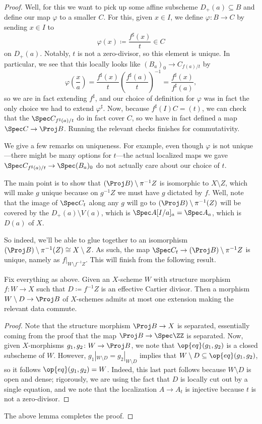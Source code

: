 \documentclass[../notes.tex]{subfiles}
\begin{document}
\begin{proof}
	Well, for this we want to pick up some affine subscheme $D_+(a)\subseteq B$ and define our map $\varphi$ to a smaller $C$. For this, given $x\in I$, we define $\varphi\colon B\to C$ by sending $x\in I$ to
	\[\varphi(x)\coloneqq\frac{f^\sharp(x)}t\in C\]
	on $D_+(a)$. Notably, $t$ is not a zero-divisor, so this element is unique. In particular, we see that this locally looks like $(B_a)_0\to C_{f(a)/t}$ by
	\[\varphi\left(\frac xa\right)=\frac{f^\sharp(x)}t\left(\frac{f^\sharp(a)}t\right)^{-1}=\frac{f^\sharp(x)}{f^\sharp(a)},\]
	so we are in fact extending $f^\sharp$, and our choice of definition for $\varphi$ was in fact the only choice we had to extend $\varphi^\sharp$. Now, because $f^\sharp(I)C=(t)$, we can check that the $\Spec C_{f^\sharp(a)/t}$ do in fact cover $C$, so we have in fact defined a map $\Spec C\to\Proj B$. Running the relevant checks finishes for commutativity.

	We give a few remarks on uniqueness. For example, even though $\varphi$ is not unique---there might be many options for $t$---the actual localized maps we gave $\Spec C_{f^\sharp(a)/t}\to\Spec(B_a)_0$ do not actually care about our choice of $t$.

	The main point is to show that $(\Proj B)\setminus\pi^{-1}Z$ is isomorphic to $X\setminus Z$, which will make $g$ unique because on $g^{-1}Z$ we must have $g$ dictated by $f$. Well, note that the image of $\Spec C_t$ along any $g$ will go to $(\Proj B)\setminus\pi^{-1}(Z)$ will be covered by the $D_+(a)\setminus V(a)$, which is $\Spec A[I/a]_a=\Spec A_a$, which is $D(a)$ of $X$.
	
	So indeed, we'll be able to glue together to an isomorphism $(\Proj B)\setminus\pi^{-1}(Z)\cong X\setminus Z$. As such, the map $\Spec C_t\to(\Proj B)\setminus\pi^{-1}Z$ is unique, namely as $f|_{W\setminus f^{-1}Z}$. This will finish from the following result.
	\begin{lemma}
		Fix everything as above. Given an $X$-scheme $W$ with structure morphism $f\colon W\to X$ such that $D\coloneqq f^{-1}Z$ is an effective Cartier divisor. Then a morphism $W\setminus D\to\Proj B$ of $X$-schemes admits at most one extension making the relevant data commute.
	\end{lemma}
	\begin{proof}
		Note that the structure morphism $\Proj B\to X$ is separated, essentially coming from the proof that the map $\Proj B\to\Spec\ZZ$ is separated. Now, given $X$-morphisms $g_1,g_2\colon W\to\Proj B$, we note that $\op{eq}(g_1,g_2)$ is a closed subscheme of $W$. However, $g_1|_{W\setminus D}=g_2|_{W\setminus D}$ implies that $W\setminus D\subseteq\op{eq}(g_1,g_2)$, so it follows $\op{eq}(g_1,g_2)=W$. Indeed, this last part follows because $W\setminus D$ is open and dense; rigorously, we are using the fact that $D$ is locally cut out by a single equation, and we note that the localization $A\to A_t$ is injective because $t$ is not a zero-divisor.
	\end{proof}
	The above lemma completes the proof.
\end{proof}
\end{document}
